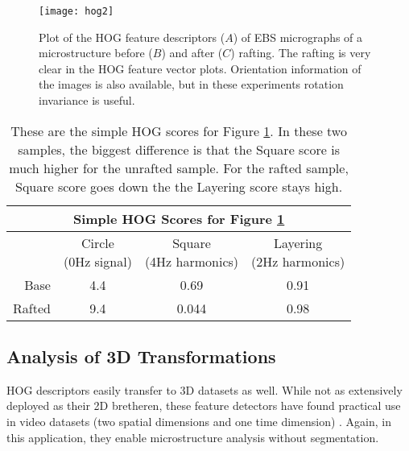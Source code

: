 \documentclass[review]{elsarticle}
\begin{document}
	
	\begin{figure}[!ht]
  		\centering
    	\texttt{[image: hog2]}
  		\caption{ Plot of the HOG feature descriptors ($A$) of EBS micrographs of a microstructure before ($B$) and after ($C$) rafting. The rafting is very clear in the HOG feature vector plots. Orientation information of the images is also available, but in these experiments rotation invariance is useful. }
  		\label{figure3}
	\end{figure}
	
	\begin{table}[h]
		\begin{center}
			\begin{tabular}{ r | c | c | c }
				\multicolumn{4}{c}{Simple HOG Scores for Figure \ref{figure3}} \\
				\hline
				& \shortstack{Circle \\ (0Hz signal)} & \shortstack{Square \\ (4Hz harmonics)} & \shortstack{Layering \\ (2Hz harmonics)} \\
				\hline
				Base & 4.4 & 0.69 & 0.91 \\
				Rafted & 9.4 & 0.044 & 0.98 \\
				\hline
			\end{tabular}
	 
	  		\label{table2}
	  		\caption{ These are the simple HOG scores for Figure \ref{figure3}. In these two samples, the biggest difference is that the Square score is much higher for the unrafted sample. For the rafted sample, Square score goes down the the Layering score stays high. }
		\end{center}
  	\end{table}
	
	\subsection{Analysis of 3D Transformations}
	HOG descriptors easily transfer to 3D datasets as well. While not as extensively deployed as their 2D bretheren, these feature detectors have found practical use in video datasets (two spatial dimensions and one time dimension) \cite{hog3d1}. Again, in this application, they enable microstructure analysis without segmentation.
	
\end{document}
